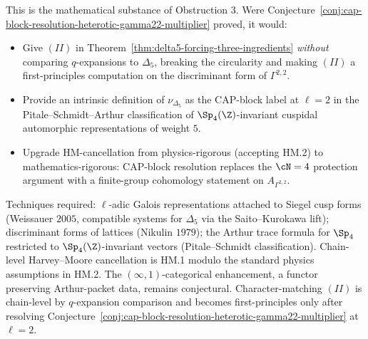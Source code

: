 This is the mathematical substance of Obstruction $3$. Were
Conjecture~\ref{conj:cap-block-resolution-heterotic-gamma22-multiplier}
proved, it would:
\begin{itemize}
\item Give $(II)$ in
Theorem~\ref{thm:delta5-forcing-three-ingredients}
\emph{without} comparing $q$-expansions to $\Delta_5$, breaking
the circularity and making $(II)$ a first-principles computation
on the discriminant form of $\Gamma^{2,2}$.
\item Provide an intrinsic definition of $\nu_{\Delta_5}$ as the
CAP-block label at $\ell = 2$ in the Pitale--Schmidt--Arthur
classification of $\Sp_4(\Z)$-invariant cuspidal automorphic
representations of weight $5$.
\item Upgrade HM-cancellation from physics-rigorous (accepting
HM.2) to mathematics-rigorous: CAP-block resolution replaces the
$\cN = 4$ protection argument with a finite-group cohomology
statement on $A_{\Gamma^{2,2}}$.
\end{itemize}
Techniques required: $\ell$-adic Galois representations attached
to Siegel cusp forms (Weissauer $2005$, compatible systems for
$\Delta_5$ via the Saito--Kurokawa lift); discriminant forms of
lattices (Nikulin $1979$); the Arthur trace formula for $\Sp_4$
restricted to $\Sp_4(\Z)$-invariant vectors (Pitale--Schmidt
classification). Chain-level Harvey--Moore cancellation is HM.1
modulo the standard physics assumptions in HM.2. The
$(\infty,1)$-categorical enhancement, a functor preserving
Arthur-packet data, remains conjectural. Character-matching $(II)$
is chain-level by $q$-expansion comparison and becomes first-principles
only after resolving
Conjecture~\ref{conj:cap-block-resolution-heterotic-gamma22-multiplier}
at $\ell = 2$.
